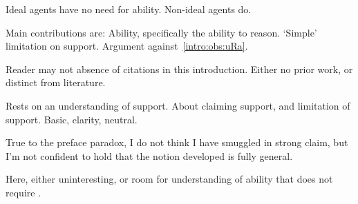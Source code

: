 \begin{note}
  Ideal agents have no need for ability.
  Non-ideal agents do.
\end{note}

\begin{note}
  Main contributions are:
  Ability, specifically the ability to reason.
  `Simple' limitation on support.
  Argument against~\ref{intro:obs:uRa}.

  Reader may not absence of citations in this introduction.
  Either no prior work, or distinct from literature.
\end{note}

\begin{note}
  Rests on an understanding of support.
  About claiming support, and limitation of support.
  Basic, clarity, neutral.

  True to the preface paradox, I do not think I have smuggled in strong claim, but I'm not confident to hold that the notion developed is fully general.

  Here, either uninteresting, or room for understanding of ability that does not require \WR{}.
\end{note}

